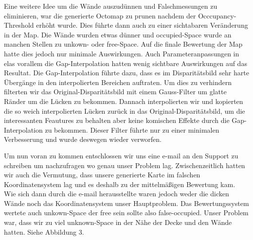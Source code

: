 \documentclass[12pt,titlepage, a4paper]{article}
\begin{document}
Eine weitere Idee um die Wände auszudünnen und Falschmessungen zu eliminieren, war die generierte Octomap zu prunen nachdem der Occcupancy-Threshold erhöht wurde. Dies führte dann auch zu einer sichtabaren Veränderung in der Map. Die Wände wurden etwas dünner und occupied-Space wurde an manchen Stellen zu unkown- oder free-Space. Auf die finale Bewertung der Map hatte dies jedoch nur minimale Auswirkungen. Auch Parameteranpassungen in elas vorallem die Gap-Interpolation hatten wenig sichtbare Auswirkungen auf das Resultat. Die Gap-Interpolation führte dazu, dass es im Disparitätsbild sehr harte Übergänge in den interpolierten Bereichen auftraten. Um dies zu verhindern filterten wir das Original-Disparitätsbild mit einem Gauss-Filter um glatte Ränder um die Lücken zu bekommen. Dannach interpolierten wir und kopierten die so weich interpolierten Lücken zurück in das Original-Disparitätsbild, um die interessanten Feautures zu behalten aber keine komischen Effekte durch die Gap-Interpolation zu bekommen. Dieser Filter führte nur zu einer minimalen Verbesserung und wurde deswegen wieder verworfen.

Um nun voran zu kommen entschlossen wir uns eine e-mail an den Support zu schreiben um nachzufragen wo genau unser Problem lag.
Zwischenzeitlich hatten wir auch die Vermutung, dass unsere generierte Karte im falschen Koordinatensystem lag und es deshalb zu der mittelmäßigen Bewertung kam.
Wie sich dann durch die e-mail herausstellte waren jedoch weder die dicken Wände noch das Koordinatensystem unser Hauptproblem. Das Bewertungssystem wertete auch unkown-Space der free sein sollte also false-occupied. Unser Problem war, dass wir zu viel unknown-Space in der Nähe der Decke und den Wände hatten. Siehe Abbildung 3.
\end{document}
